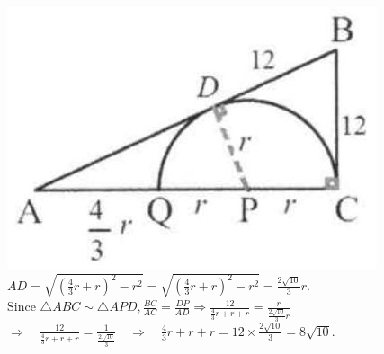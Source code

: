 \documentclass{article}
\begin{document}
\includegraphics[width=\textwidth]{images/161(1).jpg}\\
\(A D=\sqrt{\left(\frac{4}{3} r+r\right)^{2}-r^{2}}=\sqrt{\left(\frac{4}{3} r+r\right)^{2}-r^{2}}=\frac{2 \sqrt{10}}{3} r\).\\
Since \(\triangle A B C \sim \triangle A P D, \frac{B C}{A C}=\frac{D P}{A D} \Rightarrow \frac{12}{\frac{4}{3} r+r+r}=\frac{r}{\frac{2 \sqrt{10}}{3} r}\)\\
\(\Rightarrow \quad \frac{12}{\frac{4}{3} r+r+r}=\frac{1}{\frac{2 \sqrt{10}}{3}} \quad \Rightarrow \quad \frac{4}{3} r+r+r=12 \times \frac{2 \sqrt{10}}{3}=8 \sqrt{10}\).
\end{document}
